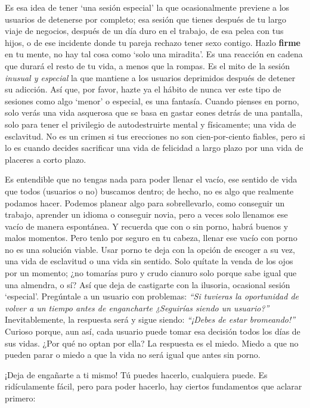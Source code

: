 \documentclass[
  openany]{book}
\begin{document}
Es esa idea de tener `una sesión especial' la que ocasionalmente previene a los usuarios de detenerse por completo; esa sesión que tienes después de tu largo viaje de negocios, después de un día duro en el trabajo, de esa pelea con tus hijos, o de ese incidente donde tu pareja rechazo tener sexo contigo. Hazlo \textbf{firme} en tu mente, no hay tal cosa como `solo una miradita'. Es una reacción en cadena que durará el resto de tu vida, a menos que la rompas. Es el mito de la sesión \emph{inusual y especial} la que mantiene a los usuarios deprimidos después de detener su adicción. Así que, por favor, hazte ya el hábito de nunca ver este tipo de sesiones como algo `menor' o especial, es una fantasía. Cuando pienses en porno, solo verás una vida asquerosa que se basa en gastar eones detrás de una pantalla, solo para tener el privilegio de autodestruirte mental y físicamente; una vida de esclavitud. No es un crimen si tus erecciones no son cien-por-ciento fiables, pero si lo es cuando decides sacrificar una vida de felicidad a largo plazo por una vida de placeres a corto plazo.

Es entendible que no tengas nada para poder llenar el vacío, ese sentido de vida que todos (usuarios o no) buscamos dentro; de hecho, no es algo que realmente podamos hacer. Podemos planear algo para sobrellevarlo, como conseguir un trabajo, aprender un idioma o conseguir novia, pero a veces solo llenamos ese vacío de manera espontánea. Y recuerda que con o sin porno, habrá buenos y malos momentos. Pero tenlo por seguro en tu cabeza, llenar ese vacío con porno no es una solución viable. Usar porno te deja con la opción de escoger a su vez, una vida de esclavitud o una vida sin sentido. Solo quítate la venda de los ojos por un momento; ¿no tomarías puro y crudo cianuro solo porque sabe igual que una almendra, o sí? Así que deja de castigarte con la ilusoria, ocasional sesión `especial'. Pregúntale a un usuario con problemas: \emph{``Si tuvieras la oportunidad de volver a un tiempo antes de engancharte ¿Seguirías siendo un usuario?''} Inevitablemente, la respuesta será y sigue siendo: \emph{``¡Debes de estar bromeando!''} Curioso porque, aun así, cada usuario puede tomar esa decisión todos los días de sus vidas. ¿Por qué no optan por ella? La respuesta es el miedo. Miedo a que no pueden parar o miedo a que la vida no será igual que antes sin porno.

¡Deja de engañarte a ti mismo! Tú puedes hacerlo, cualquiera puede. Es ridículamente fácil, pero para poder hacerlo, hay ciertos fundamentos que aclarar primero:
\end{document}

